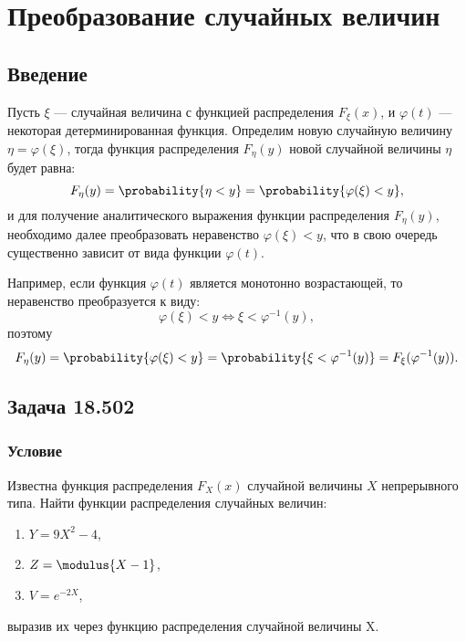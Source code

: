 \chapter{Преобразование случайных величин}


\section*{Введение}
Пусть $\xi$ --- случайная величина с функцией распределения $F_\xi(x)$, и $\varphi(t)$ --- некоторая детерминированная функция. Определим новую случайную величину
$\eta = \varphi(\xi)$, тогда функция распределения $F_\eta(y)$ новой случайной величины $\eta$ будет равна:
\begin{equation}
    F_\eta(y) = \probability{\eta < y} = \probability{\varphi(\xi) < y},
\end{equation}
и для получение аналитического выражения функции распределения $F_\eta(y)$, необходимо далее преобразовать неравенство $\varphi(\xi) < y$, что в свою очередь
существенно зависит от вида функции $\varphi(t)$.

Например, если функция $\varphi(t)$ является монотонно возрастающей, то неравенство преобразуется к виду:
\begin{equation}
    \varphi(\xi) < y \Leftrightarrow \xi < \varphi^{-1}(y),
\end{equation}
поэтому
\begin{equation}
    F_\eta(y) = \probability{\varphi(\xi) < y} = \probability{\xi < \varphi^{-1}(y)} = F_\xi (\varphi^{-1}(y)) .
\end{equation}


\section*{Задача 18.502}

\subsection*{Условие}
Известна функция распределения $F_X(x)$ случайной величины $X$ непрерывного типа. Найти функции распределения случайных величин:
\begin{enumerate}
    \item $Y = 9 X^2 - 4$,
    \item $Z = \modulus{X - 1}$,
    \item $V = e^{-2X}$,
\end{enumerate}
выразив их через функцию распределения случайной величины X.

